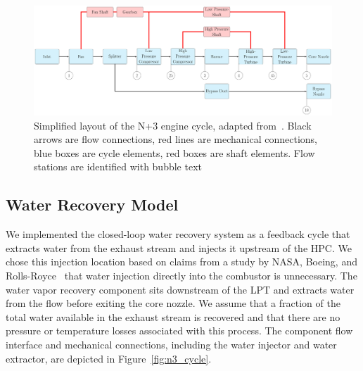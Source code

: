 \documentclass[conf]{new-aiaa}
\begin{document}
\begin{figure}[hbt!]
    \centering
    \includegraphics[width=1.0\textwidth]{N3_cycle.pdf}
    \caption{
        Simplified layout of the N+3 engine cycle, adapted from~\citet{Hendricks2019}.
        Black arrows are flow connections, red lines are mechanical connections, blue boxes are cycle elements, red boxes are shaft elements.
        Flow stations are identified with bubble text
    }
    \label{fig:N3_original}
\end{figure}

\subsection{Water Recovery Model}
We implemented the closed-loop water recovery system as a feedback cycle that extracts water from the exhaust stream and injects it upstream of the HPC.
We chose this injection location based on claims from a study by NASA, Boeing, and Rolls-Royce~\cite{Daggett2010} that water injection directly into the combustor is unnecessary.
The water vapor recovery component sits downstream of the LPT and extracts water from the flow before exiting the core nozzle.
We assume that a fraction of the total water available in the exhaust stream is recovered and that there are no pressure or temperature losses associated with this process.
The component flow interface and mechanical connections, including the water injector and water extractor, are depicted in Figure~\ref{fig:n3_cycle}.
\end{document}
